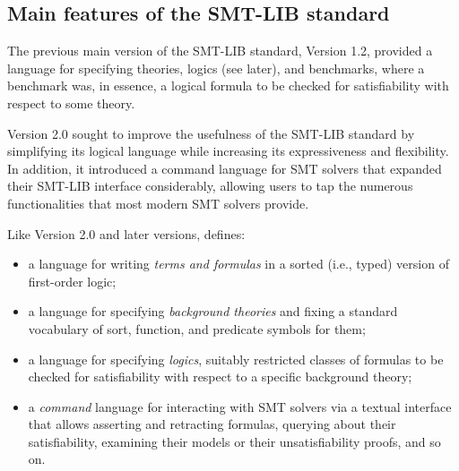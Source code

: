 \subsection{Main features of the SMT-LIB standard}

The previous main version of the SMT-LIB standard, Version 1.2, 
provided a language for specifying theories, logics (see later), and benchmarks,
where a benchmark was, in essence, a logical formula to be checked for 
satisfiability with respect to some theory.

Version 2.0 sought to improve the usefulness of the SMT-LIB standard
by simplifying its logical language 
while increasing its expressiveness and flexibility.
In addition, 
it introduced a command language for SMT solvers that 
expanded their SMT-LIB interface considerably,
allowing users to tap the numerous functionalities 
that most modern SMT solvers provide.

Like Version 2.0 and later versions, \thisversion defines:
\begin{itemize}
\item
a language for writing \emph{terms and formulas} in a sorted (i.e., typed) 
version of first-order logic;
\item
a language for specifying \emph{background theories} and 
fixing a standard vocabulary of sort, function, and predicate symbols for them;
\item
a language for specifying \emph{logics}, 
suitably restricted classes of formulas to be checked 
for satisfiability with respect to a specific background theory;
\item
a \emph{command} language for interacting with SMT solvers
via a textual interface
that allows asserting and retracting formulas, 
querying about their satisfiability, examining their models or 
their unsatisfiability proofs, and so on.

\end{itemize}

